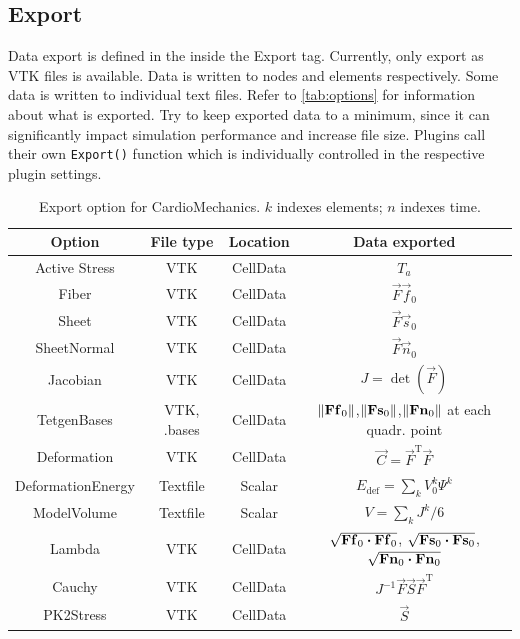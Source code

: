 \subsection{Export}
\label{subsec:Export}

Data export is defined in the  inside the Export tag.
Currently, only export as VTK files is available.
Data is written to nodes and elements respectively.
Some data is written to individual text files.
Refer to \autoref{tab:options} for information about what is exported.
Try to keep exported data to a minimum, since it can significantly impact simulation performance and increase file size.
Plugins call their own \verb+Export()+ function which is individually controlled in the respective plugin settings.


\begin{table}[h!]
    \centering
    \caption{Export option for CardioMechanics. $k$ indexes elements; $n$ indexes time.}
    \label{tab:options}
    \begin{tabular}{cccc}
    \toprule
       Option & File type & Location &  Data exported\\
       \midrule
       Active Stress & VTK & CellData &  $T_a$\\
       Fiber  & VTK & CellData & $\vec F \vec f_0$\\
       Sheet  & VTK & CellData & $\vec F \vec s_0$\\
       SheetNormal  & VTK & CellData & $\vec F \vec n_0$\\
       Jacobian  & VTK & CellData & $J = \det(\vec F)$\\
       TetgenBases  & VTK, .bases & CellData & $\norm{\vec F \vec f_0}$,$\norm{\vec F \vec s_0}$,$\norm{\vec F \vec n_0}$ at each quadr. point\\
       Deformation  & VTK & CellData  & $\vec C = \vec F^\mathrm{T}\vec F$\\
       DeformationEnergy & Textfile & Scalar & $E_\mathrm{def} = \sum_k V_0^k \Psi^k$\\
       ModelVolume & Textfile & Scalar & $V = \sum_k J^k/6$\\
       Lambda  & VTK & CellData  & $\sqrt{\vec F \vec f_0 \vdot \vec F \vec f_0}$, $\sqrt{\vec F \vec s_0 \vdot \vec F \vec s_0}$, $\sqrt{\vec F \vec n_0 \vdot \vec F \vec n_0}$ \\
       Cauchy & VTK & CellData  & $J^{-1} \vec F \vec S \vec F^\mathrm{T}$\\
       PK2Stress  & VTK & CellData & $\vec S$\\

\end{tabular}
\end{table}
